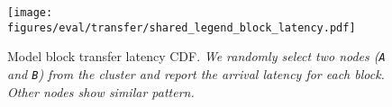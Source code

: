 \begin{figure}[t]
\centering
\texttt{[image: figures/eval/transfer/shared\_legend\_block\_latency.pdf]} \\
\vspace{-0.5em}
\vspace{-14pt}
\caption{Model block transfer latency CDF. \textit{\textmd{We randomly select two nodes ({\small\texttt{A}} and {\small\texttt{B}}) from the cluster and report the arrival latency for each block. Other nodes show similar pattern. 
}}}
\label{fig:blk_latency_cdf}
\vspace{-5pt}
\end{figure}



